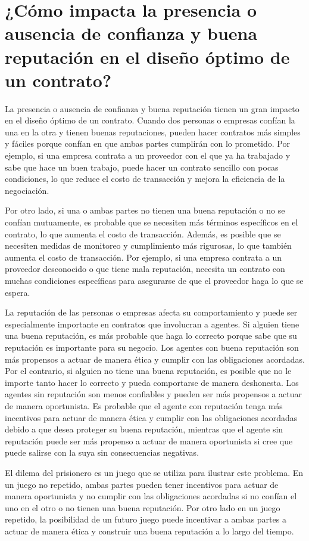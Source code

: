 \documentclass[11pt]{article}
\begin{document}
\section{¿Cómo impacta la presencia o ausencia de confianza y buena reputación en el diseño óptimo de un contrato?}
\begin{flushleft}
    La presencia o ausencia de confianza y buena reputación tienen un gran impacto en el diseño óptimo de un contrato. Cuando dos personas o empresas confían la una en la otra y tienen buenas reputaciones, pueden hacer contratos más simples y fáciles porque confían en que ambas partes cumplirán con lo prometido. Por ejemplo, si una empresa contrata a un proveedor con el que ya ha trabajado y sabe que hace un buen trabajo, puede hacer un contrato sencillo con pocas condiciones, lo que reduce el costo de transacción y mejora la eficiencia de la negociación.

    Por otro lado, si una o ambas partes no tienen una buena reputación o no se confían mutuamente, es probable que se necesiten más términos específicos en el contrato, lo que aumenta el costo de transacción. Además, es posible que se necesiten medidas de monitoreo y cumplimiento más rigurosas, lo que también aumenta el costo de transacción. Por ejemplo, si una empresa contrata a un proveedor desconocido o que tiene mala reputación, necesita un contrato con muchas condiciones específicas para asegurarse de que el proveedor haga lo que se espera.

    La reputación de las personas o empresas afecta su comportamiento y puede ser especialmente importante en contratos que involucran a agentes. Si alguien tiene una buena reputación, es más probable que haga lo correcto porque sabe que su reputación es importante para su negocio. Los agentes con buena reputación son más propensos a actuar de manera ética y cumplir con las obligaciones acordadas. Por el contrario, si alguien no tiene una buena reputación, es posible que no le importe tanto hacer lo correcto y pueda comportarse de manera deshonesta. Los agentes sin reputación son menos confiables y pueden ser más propensos a actuar de manera oportunista. Es probable que el agente con reputación tenga más incentivos para actuar de manera ética y cumplir con las obligaciones acordadas debido a que desea proteger su buena reputación, mientras que el agente sin reputación puede ser más propenso a actuar de manera oportunista si cree que puede salirse con la suya sin consecuencias negativas.

    El dilema del prisionero es un juego que se utiliza para ilustrar este problema. En un juego no repetido, ambas partes pueden tener incentivos para actuar de manera oportunista y no cumplir con las obligaciones acordadas si no confían el uno en el otro o no tienen una buena reputación. Por otro lado en un juego repetido, la posibilidad de un futuro juego puede incentivar a ambas partes a actuar de manera ética y construir una buena reputación a lo largo del tiempo.
\end{flushleft}
\end{document}
